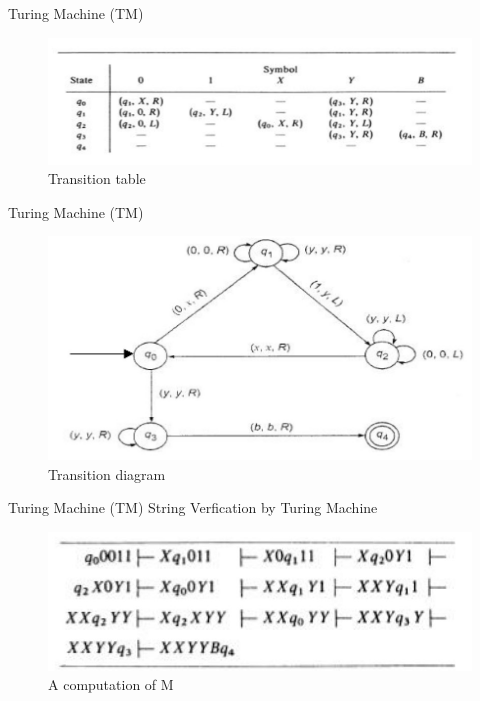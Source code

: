 \documentclass{beamer}
\begin{document}
\begin{frame}{Turing Machine (TM)}
\begin{figure}
	\includegraphics[scale=.45]{img5/m4}
	\caption{Transition table}
\end{figure}
\end{frame}	
\begin{frame}{Turing Machine (TM)}
	\begin{figure}
		\includegraphics[scale=.45]{img5/m5}
		\caption{Transition diagram}
	\end{figure}
\end{frame}	
\begin{frame}{Turing Machine (TM)}
	String Verfication by Turing Machine
	\begin{figure}
		\includegraphics[scale=.45]{img5/m6}
		\caption{A computation of M}
	\end{figure}
\end{frame}	
\end{document}
